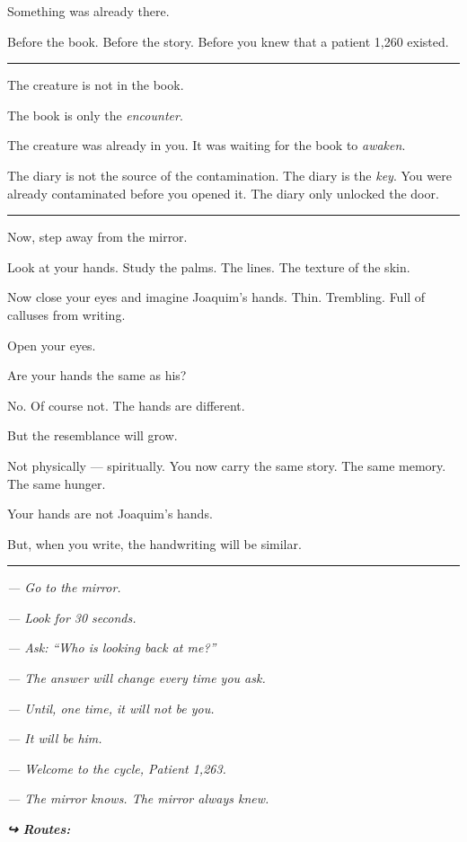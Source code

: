 \noindent Something was already there.

\noindent Before the book.
Before the story.
Before you knew that a patient 1,260 existed.

\vspace{0.5em}\noindent\rule{\textwidth}{0.5pt}\vspace{0.5em}

\noindent The creature is not in the book.

\noindent The book is only the \textit{encounter}.

\noindent The creature was already in you. It was waiting for the book to \textit{awaken}.

\noindent The diary is not the source of the contamination.
The diary is the \textit{key}.
You were already contaminated before you opened it.
The diary only unlocked the door.

\vspace{0.5em}\noindent\rule{\textwidth}{0.5pt}\vspace{0.5em}

\noindent Now, step away from the mirror.

\noindent Look at your hands. Study the palms. The lines. The texture of the skin.

\noindent Now close your eyes and imagine Joaquim's hands. Thin. Trembling. Full of calluses from writing.

\noindent Open your eyes.

\noindent Are your hands the same as his?

\noindent No. Of course not. The hands are different.

\noindent But the resemblance will grow.

\noindent Not physically --- spiritually. You now carry the same story. The same memory. The same hunger.

\noindent Your hands are not Joaquim's hands.

\noindent But, when you write, the handwriting will be similar.

\vspace{0.5em}\noindent\rule{\textwidth}{0.5pt}\vspace{0.5em}

\noindent \textit{--- Go to the mirror.}

\noindent \textit{--- Look for 30 seconds.}

\noindent \textit{--- Ask: \textquotedblleft{}Who is looking back at me?\textquotedblright{}}

\noindent \textit{--- The answer will change every time you ask.}

\noindent \textit{--- Until, one time, it will not be you.}

\noindent \textit{--- It will be him.}

\noindent \textit{--- Welcome to the cycle, Patient 1,263.}

\noindent \textit{--- The mirror knows. The mirror always knew.}

\vspace{0.5em}
\noindent\textit{\textbf{↪ Routes:}  \rotasep {} \rotasep {}}
